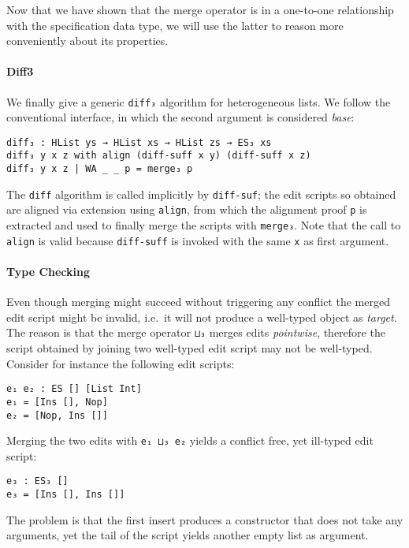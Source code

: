 \documentclass[preprint]{sigplanconf}
\theoremstyle{plain}
\begin{document}
        Now that we have shown that the merge operator is in a
        one-to-one relationship with the specification data type, we
        will use the latter to reason more conveniently about its
        properties.

	\paragraph{Diff3}
	We finally give a generic \texttt{diff₃} algorithm for
        heterogeneous lists.
        We follow the conventional interface, in which the second
        argument is considered \emph{base}:
\begin{verbatim}
diff₃ : HList ys → HList xs → HList zs → ES₃ xs
diff₃ y x z with align (diff-suff x y) (diff-suff x z)
diff₃ y x z | WA _ _ p = merge₃ p
\end{verbatim}
	
	The \texttt{diff} algorithm is called implicitly by
        \texttt{diff-suf}; the edit scripts so obtained are aligned
        via extension using \texttt{align}, from which the alignment
        proof \texttt{p} is extracted and used to finally merge the
        scripts with \texttt{merge₃}.  Note that the call to
        \texttt{align} is valid because \texttt{diff-suff} is invoked
        with the same \texttt{x} as first argument.

        \paragraph{Type Checking}
	Even though merging might succeed without triggering any
        conflict the merged edit script might be invalid, i.e.\ it will
        not produce a well-typed object as \emph{target}.
        The reason is that the merge operator \texttt{⊔₃} merges edits
        \emph{pointwise}, therefore the script obtained by joining two
        well-typed edit script may not be well-typed.  Consider for
        instance the following edit scripts:
\begin{verbatim}
e₁ e₂ : ES [] [List Int]
e₁ = [Ins [], Nop]
e₂ = [Nop, Ins []]
\end{verbatim}
        Merging the two edits with \texttt{e₁ ⊔₃ e₂} yields a conflict
        free, yet ill-typed edit script:
\begin{verbatim}
e₃ : ES₃ []
e₃ = [Ins [], Ins []]
\end{verbatim}
        The problem is that the first insert produces a constructor
        that does not take any arguments, yet the tail of the script
        yields another empty list as argument.
        
\end{document}
